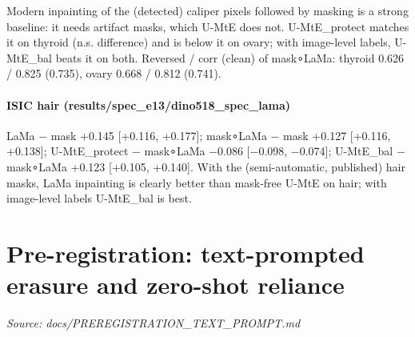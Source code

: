 {Modern inpainting of the (detected) caliper pixels followed by masking is a strong baseline: it needs artifact
masks, which U-MtE does not. U-MtE\_protect matches it on thyroid (n.s. difference) and is below it on ovary;
with image-level labels, U-MtE\_bal beats it on both. Reversed / corr (clean) of mask∘LaMa: thyroid 0.626 / 0.825
(0.735), ovary 0.668 / 0.812 (0.741).

\paragraph{ISIC hair (results/spec\_e13/dino518\_spec\_lama)}\label{isic-hair-resultsspec_e13dino518_spec_lama}

LaMa − mask +0.145 {[}+0.116, +0.177{]}; mask∘LaMa − mask +0.127 {[}+0.116, +0.138{]}; U-MtE\_protect − mask∘LaMa −0.086
{[}−0.098, −0.074{]}; U-MtE\_bal − mask∘LaMa +0.123 {[}+0.105, +0.140{]}. With the (semi-automatic, published) hair masks,
LaMa inpainting is clearly better than mask-free U-MtE on hair; with image-level labels U-MtE\_bal is best.

}

\section{Pre-registration: text-prompted erasure and zero-shot reliance}\label{doc:PREREGISTRATION_TEXT_PROMPT}
\noindent\textit{Source: docs/PREREGISTRATION\_TEXT\_PROMPT.md}

